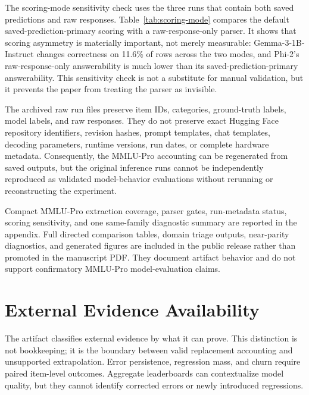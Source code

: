 \documentclass[manuscript, screen, review, nonacm]{jair}
\begin{document}
The scoring-mode sensitivity check uses the three runs that contain both saved predictions and raw responses. Table~\ref{tab:scoring-mode} compares the default saved-prediction-primary scoring with a raw-response-only parser. It shows that scoring asymmetry is materially important, not merely measurable: Gemma-3-1B-Instruct changes correctness on 11.6\% of rows across the two modes, and Phi-2's raw-response-only answerability is much lower than its saved-prediction-primary answerability. This sensitivity check is not a substitute for manual validation, but it prevents the paper from treating the parser as invisible.

\begin{table}[t]
\centering
\small
\resizebox{\linewidth}{!}{}
\caption{Scoring-mode sensitivity for runs with both saved predictions and raw responses. Values are percentages. $\Delta$ is raw-response-only accuracy minus saved-prediction-primary accuracy.}
\label{tab:scoring-mode}
\end{table}

The archived raw run files preserve item IDs, categories, ground-truth labels, model labels, and raw responses. They do not preserve exact Hugging Face repository identifiers, revision hashes, prompt templates, chat templates, decoding parameters, runtime versions, run dates, or complete hardware metadata. Consequently, the MMLU-Pro accounting can be regenerated from saved outputs, but the original inference runs cannot be independently reproduced as validated model-behavior evaluations without rerunning or reconstructing the experiment.

Compact MMLU-Pro extraction coverage, parser gates, run-metadata status, scoring sensitivity, and one same-family diagnostic summary are reported in the appendix. Full directed comparison tables, domain triage outputs, near-parity diagnostics, and generated figures are included in the public release rather than promoted in the manuscript PDF. They document artifact behavior and do not support confirmatory MMLU-Pro model-evaluation claims.

\section{External Evidence Availability}

The artifact classifies external evidence by what it can prove. This distinction is not bookkeeping; it is the boundary between valid replacement accounting and unsupported extrapolation. Error persistence, regression mass, and churn require paired item-level outcomes. Aggregate leaderboards can contextualize model quality, but they cannot identify corrected errors or newly introduced regressions.
\end{document}
